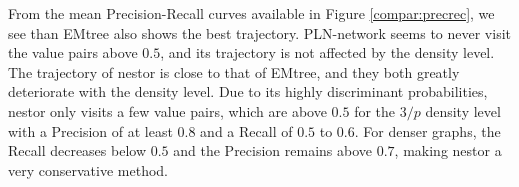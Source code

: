 \begin{subappendices}
From the mean Precision-Recall curves available in Figure \ref{compar:precrec}, we see than EMtree also shows the best trajectory. PLN-network seems to never visit the value pairs above $0.5$, and its trajectory is not affected by the density level. The trajectory of nestor is close to that of EMtree, and they both greatly deteriorate with the density level.  Due to its highly discriminant probabilities, nestor only visits a few value pairs, which are above $0.5$ for the $3/p$ density level with a Precision of at least $0.8$ and a Recall of $0.5$ to $0.6$. For denser graphs, the Recall decreases below $0.5$ and the Precision remains above $0.7$, making nestor a very conservative method.


\end{subappendices}